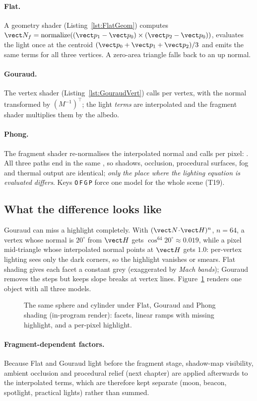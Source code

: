 \paragraph{Flat.} A geometry shader (Listing~\ref{lst:FlatGeom}) computes $\vect N_f=\mathrm{normalize}((\vect p_1-\vect p_0)\times(\vect p_2-\vect p_0))$, evaluates the light once at the centroid $(\vect p_0+\vect p_1+\vect p_2)/3$ and emits the same  terms for all three vertices. A zero-area triangle falls back to an up normal.
\lstFlatGeom
\paragraph{Gouraud.} The vertex shader (Listing~\ref{lst:GouraudVert}) calls  per vertex, with the normal transformed by $(M^{-1})^\top$; the light \emph{terms} are interpolated and the fragment shader multiplies them by the albedo.
\lstGouraudVert
\paragraph{Phong.} The fragment shader re-normalises the interpolated normal and calls  per pixel: .
All three paths end in the same , so shadows, occlusion, procedural surfaces, fog and thermal output are identical; \emph{only the place where the lighting equation is evaluated differs}. Keys \texttt{O}\,\texttt{F}\,\texttt{G}\,\texttt{P} force one model for the whole scene (T19).

\subsection{What the difference looks like}
Gouraud can miss a highlight completely. With $(\vect N\!\cdot\!\vect H)^n$, $n=64$, a vertex whose normal is $20^\circ$ from $\vect H$ gets $\cos^{64}20^\circ\approx0.019$, while a pixel mid-triangle whose interpolated normal points at $\vect H$ gets $1.0$: per-vertex lighting sees only the dark corners, so the highlight vanishes or smears. Flat shading gives each facet a constant grey (exaggerated by \emph{Mach bands}); Gouraud removes the steps but keeps slope breaks at vertex lines. Figure~\ref{fig:shademodels} renders one object with all three models.
\begin{figure}[h]
\centering
{}
\caption{The same sphere and cylinder under Flat, Gouraud and Phong shading (in-program render): facets, linear ramps with missing highlight, and a per-pixel highlight.}\label{fig:shademodels}
\end{figure}
\paragraph{Fragment-dependent factors.} Because Flat and Gouraud light before the fragment stage, shadow-map visibility, ambient occlusion and procedural relief (next chapter) are applied afterwards to the interpolated terms, which are therefore kept separate (moon, beacon, spotlight, practical lights) rather than summed.
